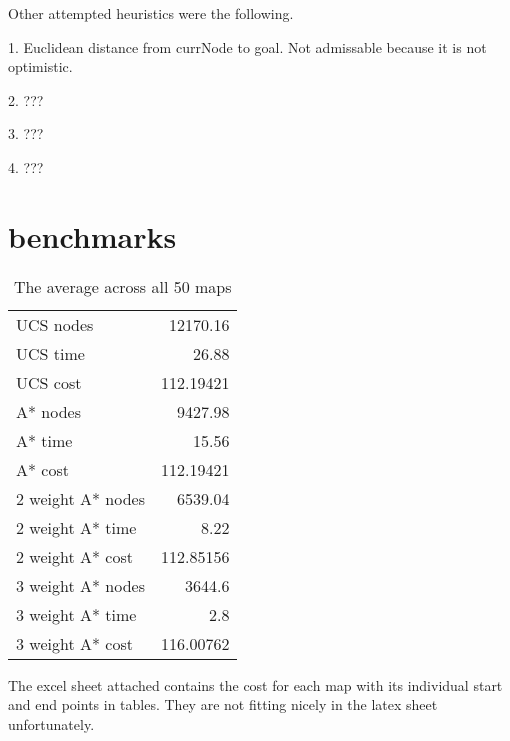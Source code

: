 \documentclass[11pt]{article} %
\begin{document}
Other attempted heuristics were the following.

1. Euclidean distance from currNode to goal. Not admissable because it is not optimistic.

2. ???

3. ???

4. ???

\section{benchmarks}
\begin{table}[htbp]
  \centering
  \caption{The average across all 50 maps}
    \begin{tabular}{lr}
    UCS nodes & 12170.16 \\
    UCS time & 26.88 \\
    UCS cost & 112.19421 \\
    A* nodes & 9427.98 \\
    A* time & 15.56 \\
    A* cost & 112.19421 \\
    2 weight A* nodes & 6539.04 \\
    2 weight A* time & 8.22 \\
    2 weight A* cost & 112.85156 \\
    3 weight A* nodes & 3644.6 \\
    3 weight A* time & 2.8 \\
    3 weight A* cost & 116.00762 \\
    \end{tabular}%
  \label{tab:addlabel}%
\end{table}%



The excel sheet attached contains the cost for each map with its individual start and end points in tables. They are not fitting nicely in the latex sheet unfortunately. 
\end{document}
